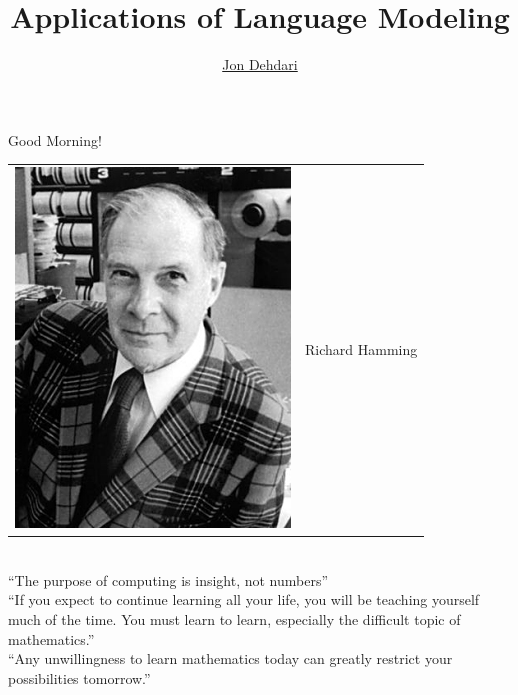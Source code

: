 \documentclass[xcolor=pdftex,x11names,table,hyperref]{beamer}
\begin{document}
\title{Applications of Language Modeling \\[1.5em]
 }
\author{\href{http://jon.dehdari.org}{Jon Dehdari}}
\frame{\titlepage}

\begin{frame}{Good Morning!}
	\begin{tabular}{ll}
		\parbox[c]{6.5em}{\includegraphics[width=0.28\textheight]{images/Richard_Hamming_from_Wikipedia.jpg} } & \hspace*{1.0em} {\Large Richard Hamming }
	\end{tabular} \\[1.6em]
		``The purpose of computing is insight, not numbers''\\[1.4em]
		\pause
		``If you expect to continue learning all your life, you will be teaching yourself much of the time. You must learn to learn, especially the difficult topic of mathematics.'' \\[1.4em]
		\pause
		``Any unwillingness to learn mathematics today can greatly restrict your possibilities tomorrow.''
\end{frame}
\end{document}

